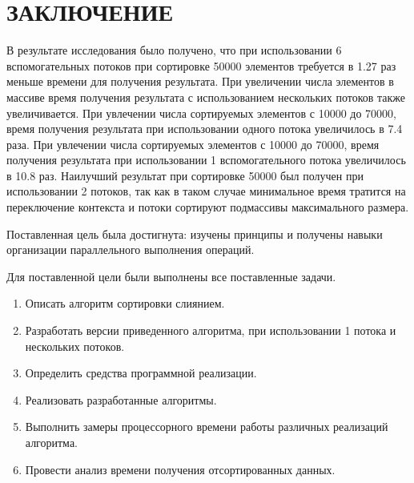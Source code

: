 \chapter*{\hfill{\centering  ЗАКЛЮЧЕНИЕ}\hfill}

В результате исследования было получено, что при использовании 6 вспомогательных потоков при сортировке 50000 элементов требуется в 1.27 раз меньше времени для получения результата. 
При увеличении числа элементов в массиве
время получения результата с использованием нескольких потоков также увеличивается. При увлечении числа сортируемых элементов с 10000 до 70000, время получения результата при использовании одного потока  увеличилось в 7.4 раза.
При увлечении числа сортируемых элементов с 10000 до 70000, время получения результата при использовании 1 вспомогательного потока увеличилось в 10.8 раз. Наилучший результат при сортировке 50000 был получен при использовании 2 потоков, так как в таком случае минимальное время тратится на переключение контекста и потоки сортируют подмассивы максимального размера.


Поставленная цель была достигнута: изучены принципы и получены навыки организации параллельного выполнения операций.

Для поставленной цели были выполнены все поставленные задачи.
\label{sec:targets}
\begin{enumerate}
	\item Описать алгоритм сортировки слиянием.
	\item Разработать версии  приведенного алгоритма, при использовании 1 потока и нескольких потоков.
	\item Определить средства программной реализации.
	\item Реализовать разработанные алгоритмы.
	\item Выполнить замеры процессорного времени работы различных реализаций алгоритма.
	\item Провести анализ времени получения отсортированных данных.
\end{enumerate}

 

